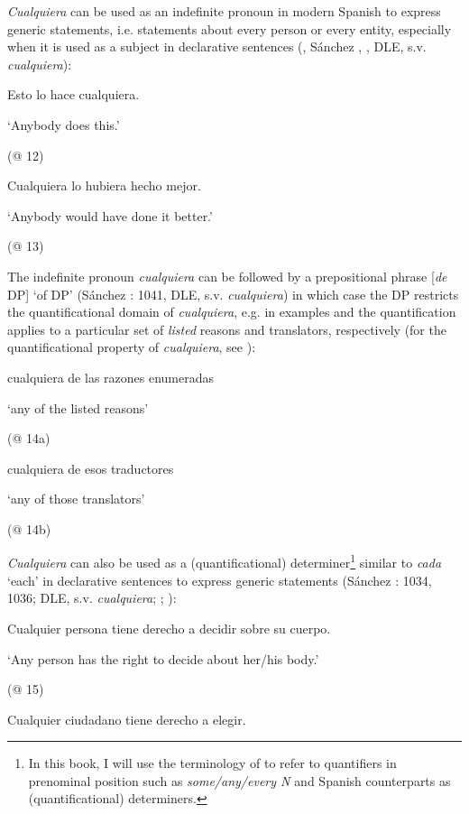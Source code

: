 \documentclass[output=paper]{langscibook}
\begin{document}
\textit{Cualquiera} can be used as an indefinite pronoun in modern Spanish to express generic statements, i.e. statements about every person or every entity, especially when it is used as a subject in declarative sentences (\citealt{Brucart1999}, Sánchez \citealt{López1999}, \citealt{Eberenz2000}, DLE, s.v. \textit{cualquiera}):

  Esto lo hace cualquiera. 

  ‘Anybody does this.’

  (@ 12)

  Cualquiera lo hubiera hecho mejor. 

  ‘Anybody would have done it better.’

  (@ 13)

The indefinite pronoun \textit{cualquiera} can be followed by a prepositional phrase [\textit{de} DP] ‘of DP’ (Sánchez \citealt{López1999}: 1041, DLE, s.v. \textit{cualquiera}) in which case the DP restricts the quantificational domain of \textit{cualquiera}, e.g. in examples  and  the quantification applies to a particular set of \textit{listed} reasons and translators, respectively (for the quantificational property of \textit{cualquiera}, see ):

\label{bkm:Ref72400832}  cualquiera de las razones enumeradas

  ‘any of the listed reasons’

  (@ 14a)

\label{bkm:Ref533953098}  cualquiera de esos traductores

  ‘any of those translators’

  (@ 14b)

\textit{Cualquiera} can also be used as a (quantificational) determiner\footnote{ \textrm{In this book, I will use the terminology of \citet{Zamparelli2000} to refer to quantifiers in prenominal position such as} \textrm{\textit{some/any/every N}} \textrm{and Spanish counterparts as (quantificational) determiners.}} similar to \textit{cada} ‘each’ in declarative sentences to express generic statements (Sánchez \citealt{López1999}: 1034, 1036; DLE, s.v. \textit{cualquiera}; \citealt{Menéndez-Benito2010}; \citealt{Rivero2011}):

  Cualquier persona tiene derecho a decidir sobre su cuerpo.

  ‘Any person has the right to decide about her/his body.’

  (@ 15)

  Cualquier ciudadano tiene derecho a elegir. 
\end{document}

